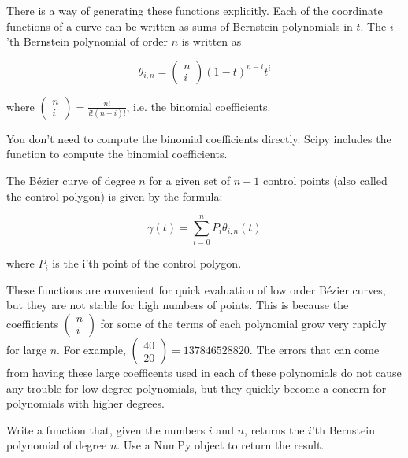 There is a way of generating these functions explicitly.
Each of the coordinate functions of a curve can be written as sums of Bernstein polynomials in $t$.
The $i$'th Bernstein polynomial of order $n$ is written as

$$\theta_{i,n}=\left( \begin{smallmatrix} n\\ i \end{smallmatrix} \right) (1-t)^{n-i} t^i$$

where $\left( \begin{smallmatrix} n\\ i \end{smallmatrix} \right) = \frac{n!}{i!(n-i)!}$, i.e. the binomial coefficients.

\begin{info}
You don't need to compute the binomial coefficients directly.
Scipy includes the function  to compute the binomial coefficients.
\end{info}

The B\'{e}zier curve of degree $n$ for a given set of $n+1$ control points (also called the control polygon) is given by the formula:

$$\gamma (t) = \sum_{i=0}^n P_i \theta_{i,n} (t)$$

where $P_i$ is the i'th point of the control polygon.

These functions are convenient for quick evaluation of low order B\'{e}zier curves, but they are not stable for high numbers of points.
This is because the coefficients $\left( \begin{smallmatrix} n\\ i \end{smallmatrix} \right)$ for some of the terms of each polynomial grow very rapidly for large $n$.
For example, $\left( \begin{smallmatrix} 40\\ 20 \end{smallmatrix} \right)=137846528820$.
The errors that can come from having these large coefficents used in each of these polynomials do not cause any trouble for low degree polynomials, but they quickly become a concern for polynomials with higher degrees.

\begin{problem}
Write a function that, given the numbers $i$ and $n$, returns the $i$'th Bernstein polynomial of degree $n$.
Use a NumPy  object to return the result.
\end{problem}

